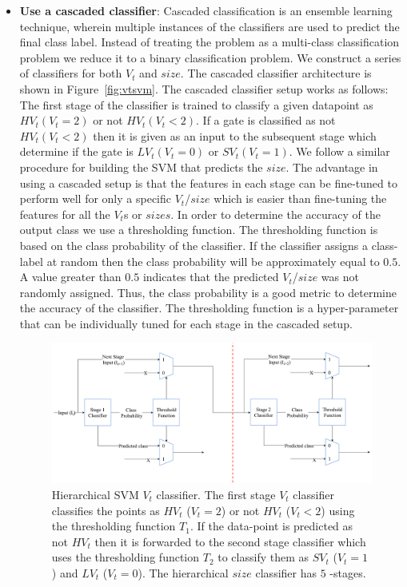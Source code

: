 \begin{itemize}
    \item\textbf{ Use a cascaded classifier}: Cascaded classification is an ensemble learning technique, wherein multiple instances of the classifiers are used to predict the final class label. Instead of treating the problem as a multi-class classification problem we reduce it to a binary classification problem. We construct a series of classifiers for both $V_t$ and $size$. The cascaded classifier architecture is shown in Figure~\ref{fig:vtsvm}. The cascaded classifier setup works as follows: The first stage of the classifier is trained to classify a given datapoint as $HV_t (V_t=2)$ or not $HV_t (V_t< 2)$. If a gate is classified as not $HV_t (V_t<2)$ then it is given as an input to the subsequent stage which determine if the gate is $LV_t (V_t=0)$ or $SV_t (V_t=1)$. We follow a similar procedure for building the SVM that predicts the ${size}$. The  advantage in using a cascaded setup is that the features in each stage can be fine-tuned to perform well for only a specific $V_t$/$size$ which is easier than fine-tuning the features for all the $V_t$s or $sizes$. 
    In order to determine the accuracy of the output class we use a thresholding function. The thresholding function is based on the class probability of the classifier. If the classifier assigns a class-label at random then the class probability will be approximately equal to $0.5$. A value greater than $0.5$ indicates that the predicted $V_t$/$size$ was not randomly assigned. Thus, the class probability is a good metric to determine the accuracy of the classifier. The thresholding function is a hyper-parameter that can be individually tuned for each stage in the cascaded setup. 
\begin{figure}[!t]
 \begin{center}
 \includegraphics[scale=0.3]{Chapter3/fig/flowchart.pdf}
 \caption{Hierarchical SVM $V_t$ classifier. The first stage $V_t$ classifier classifies the points as $HV_t$ ($V_t = 2 $) or not $HV_t$ ($V_t < 2$) using the thresholding function $T_1$. If the data-point is predicted as not $HV_t$ then it is forwarded to the second stage classifier which uses the thresholding function $T_2$ to classify them as $SV_t$ ($V_t = 1$) and $LV_t$ ($V_t = 0$). The hierarchical $size$ classifier has $5$ -stages.}

\end{center}
\end{figure}
\end{itemize}
